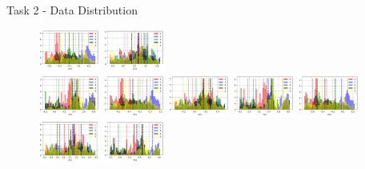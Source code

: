 \documentclass{beamer}
\begin{document}
\begin{frame}{Task 2 - Data Distribution}
\begin{figure}[H]
    \includegraphics[width=0.18\textwidth]{../code/Task2/Analysis/Hist-Z21}
    \includegraphics[width=0.18\textwidth]{../code/Task2/Analysis/Hist-X31} \\
    \includegraphics[width=0.18\textwidth]{../code/Task2/Analysis/Hist-Y31}
    \includegraphics[width=0.18\textwidth]{../code/Task2/Analysis/Hist-Z31}
    \includegraphics[width=0.18\textwidth]{../code/Task2/Analysis/Hist-X41}
    \includegraphics[width=0.18\textwidth]{../code/Task2/Analysis/Hist-Y41}
    \includegraphics[width=0.18\textwidth]{../code/Task2/Analysis/Hist-Z41} \\
    \includegraphics[width=0.18\textwidth]{../code/Task2/Analysis/Hist-X51}
    \includegraphics[width=0.18\textwidth]{../code/Task2/Analysis/Hist-Y51}

\end{figure}
\end{frame}
\end{document}

